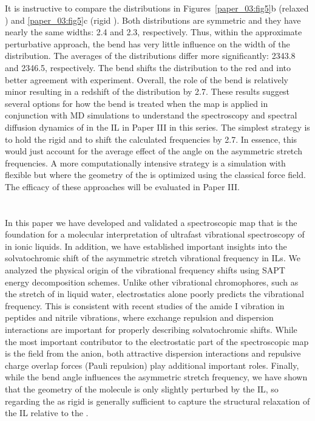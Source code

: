 \documentclass[%
  class = book,%
  crop = false,%
  float = true,%
  multi = true,%
  preview = false,%
]{standalone}
\begin{document}
It is instructive to compare the distributions in Figures~\ref{paper_03:fig5}b (relaxed ) and \ref{paper_03:fig5}c (rigid ). Both distributions are symmetric and they have nearly the same widths: \SI{2.4}{\wavenumber} and \SI{2.3}{\wavenumber}, respectively. Thus, within the approximate perturbative approach, the bend has very little influence on the width of the distribution. The averages of the distributions differ more significantly: \SI{2343.8}{\wavenumber} and \SI{2346.5}{\wavenumber}, respectively. The bend shifts the distribution to the red and into better agreement with experiment. Overall, the role of the bend is relatively minor resulting in a redshift of the distribution by \SI{2.7}{\wavenumber}. These results suggest several options for how the bend is treated when the map is applied in conjunction with MD simulations to understand the spectroscopy and spectral diffusion dynamics of  in the \ce{[C4C1im][PF6]} IL in Paper III\cite{Brinzer2018} in this series. The simplest strategy is to hold the  rigid and to shift the calculated frequencies by \SI{2.7}{\wavenumber}. In essence, this would just account for the average effect of the  angle on the asymmetric stretch frequencies. A more computationally intensive strategy is a simulation with  flexible but where the geometry of the  is optimized using the classical force field. The efficacy of these approaches will be evaluated in Paper III\cite{Brinzer2018}.

\section{\texorpdfstring{}{Conclusions}}
\label{paper_03:sec:VI}

In this paper we have developed and validated a spectroscopic map that is the foundation for a molecular interpretation of ultrafast vibrational spectroscopy of  in ionic liquids. In addition, we have established important insights into the solvatochromic shift of the  asymmetric stretch vibrational frequency in ILs. We analyzed the physical origin of the vibrational frequency shifts using SAPT energy decomposition schemes. Unlike other vibrational chromophores, such as the  stretch of  in liquid water\cite{Gruenbaum2013}, electrostatics alone poorly predicts the vibrational frequency. This is consistent with recent studies of the amide I vibration in peptides\cite{Basiak2015} and nitrile vibrations\cite{C6CP01578F}, where exchange repulsion and dispersion interactions are important for properly describing solvatochromic shifts. While the most important contributor to the electrostatic part of the spectroscopic map is the field from the anion, both attractive dispersion interactions and repulsive charge overlap forces (Pauli repulsion) play additional important roles. Finally, while the  bend angle influences the asymmetric stretch frequency, we have shown that the geometry of the  molecule is only slightly perturbed by the IL, so regarding the  as rigid is generally sufficient to capture the structural relaxation of the IL relative to the .
\end{document}
